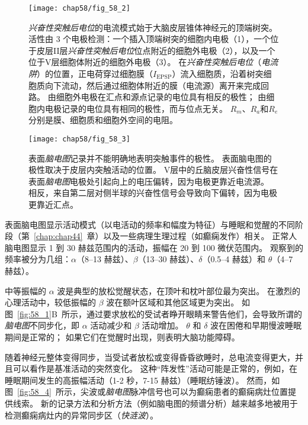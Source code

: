 \begin{figure}[htbp]
	\centering
	\texttt{[image: chap58/fig\_58\_2]}
	\caption{\textit{兴奋性突触后电位}的电流模式始于大脑皮层锥体神经元的顶端树突。
		活性由 3 个电极检测：一个插入顶端树突的细胞内电极（1），一个位于皮层II层\textit{兴奋性突触后电位}位点附近的细胞外电极（2），以及一个位于V层细胞体附近的细胞外电极（3）。
		在\textit{兴奋性突触后电位}（\textit{电流阱}）的位置，正电荷穿过细胞膜（$ I_{\text{EPSP}} $）流入细胞质，沿着树突细胞质向下流动，然后通过细胞体附近的膜（电流源）离开来完成回路。
		由细胞外电极在汇点和源点记录的电位具有相反的极性；
		由细胞内电极记录的电位具有相同的极性，而与位点无关。
		$ R_m $、$ R_a $和$ R_e $分别是膜、细胞质和细胞外空间的电阻。}
	\label{fig:58_2}
\end{figure}


\begin{figure}[htbp]
	\centering
	\texttt{[image: chap58/fig\_58\_3]}
	\caption{表面\textit{脑电图}记录并不能明确地表明突触事件的极性。
		表面脑电图的极性取决于皮层内突触活动的位置。
		V层中的丘脑皮层兴奋性信号在表面\textit{脑电图}电极处引起向上的电压偏转，因为电极更靠近电流源。
		相反，来自第二层对侧半球的兴奋性信号会导致向下偏转，因为电极更靠近汇点。}
	\label{fig:58_3}
\end{figure}


表面脑电图显示活动模式（以电活动的频率和幅度为特征）与睡眠和觉醒的不同阶段（第~\ref{chap:chap44}~章）以及一些病理生理过程（如癫痫发作）相关。
正常人脑电图显示 1 到 30 赫兹范围内的活动，振幅在 20 到 100 微伏范围内。
观察到的频率被分为几组：$\alpha$（8–13 赫兹）、$ \beta $（13–30 赫兹）、$ \delta $（0.5–4 赫兹）和 $ \theta $（4–7 赫兹）。


中等振幅的 $ \alpha $ 波是典型的放松觉醒状态，在顶叶和枕叶部位最为突出。
在激烈的心理活动中，较低振幅的 $ \beta $ 波在额叶区域和其他区域更为突出。
如图~\ref{fig:58_1}B~所示，通过要求放松的受试者睁开眼睛来警告他们，会导致所谓的\textit{脑电图}不同步化，即 $\alpha$ 活动减少和 $ \beta $ 活动增加。
$ \theta $ 和 $ \delta $ 波在困倦和早期慢波睡眠期间是正常的；
如果它们在觉醒时出现，则表明大脑功能障碍。


随着神经元整体变得同步，当受试者放松或变得昏昏欲睡时，总电流变得更大，并且可以看作是基准活动的突然变化。
这种“阵发性”活动可能是正常的，例如，在睡眠期间发生的高振幅活动（1-2 秒，7-15 赫兹）（睡眠纺锤波）。
然而，如图~\ref{fig:58_4}~所示，尖波或\textit{脑电图}脉冲信号也可以为癫痫患者的癫痫病灶位置提供线索。
新的记录方法和分析方法（例如脑电图的频谱分析）越来越多地被用于检测癫痫病灶内的异常同步区（\textit{快涟波}）。


